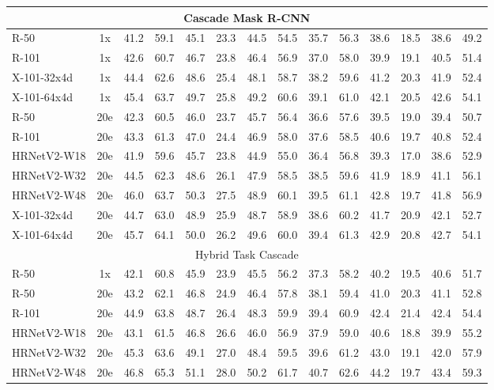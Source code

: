 \documentclass[10pt,journal,compsoc]{IEEEtran}
\begin{document}
\begin{center}
\begin{longtable}{l|c|cccccc|cccccc}
	\multicolumn{14}{c}{Cascade Mask R-CNN} \\
	\hline
	R-50        & 1x  & 41.2 & 59.1 & 45.1 & 23.3 & 44.5 & 54.5 & 35.7 & 56.3 & 38.6 & 18.5 & 38.6 & 49.2 \\
	R-101       & 1x  & 42.6 & 60.7 & 46.7 & 23.8 & 46.4 & 56.9 & 37.0 & 58.0 & 39.9 & 19.1 & 40.5 & 51.4 \\
	X-101-32x4d & 1x  & 44.4 & 62.6 & 48.6 & 25.4 & 48.1 & 58.7 & 38.2 & 59.6 & 41.2 & 20.3 & 41.9 & 52.4 \\
	X-101-64x4d & 1x  & 45.4 & 63.7 & 49.7 & 25.8 & 49.2 & 60.6 & 39.1 & 61.0 & 42.1 & 20.5 & 42.6 & 54.1 \\
	R-50        & 20e & 42.3 & 60.5 & 46.0 & 23.7 & 45.7 & 56.4 & 36.6 & 57.6 & 39.5 & 19.0 & 39.4 & 50.7 \\
	R-101       & 20e & 43.3 & 61.3 & 47.0 & 24.4 & 46.9 & 58.0 & 37.6 & 58.5 & 40.6 & 19.7 & 40.8 & 52.4 \\
    {HRNetV2-W18} & 20e & 41.9 & 59.6 & 45.7 & 23.8 & 44.9 & 55.0 & 36.4 & 56.8 & 39.3 & 17.0 & 38.6 & 52.9 \\
    {HRNetV2-W32} & 20e & 44.5 & 62.3 & 48.6 & 26.1 & 47.9 & 58.5 & 38.5 & 59.6 & 41.9 & 18.9 & 41.1 & 56.1 \\
    {HRNetV2-W48} & 20e & 46.0 & 63.7 & 50.3 & 27.5 & 48.9 & 60.1 & 39.5 & 61.1 & 42.8 & 19.7 & 41.8 & 56.9 \\
	X-101-32x4d & 20e & 44.7 & 63.0 & 48.9 & 25.9 & 48.7 & 58.9 & 38.6 & 60.2 & 41.7 & 20.9 & 42.1 & 52.7 \\
	X-101-64x4d & 20e & 45.7 & 64.1 & 50.0 & 26.2 & 49.6 & 60.0 & 39.4 & 61.3 & 42.9 & 20.8 & 42.7 & 54.1 \\
	\hline
	\multicolumn{14}{c}{Hybrid Task Cascade} \\
	\hline
	R-50        & 1x  & 42.1 & 60.8 & 45.9 & 23.9 & 45.5 & 56.2 & 37.3 & 58.2 & 40.2 & 19.5 & 40.6 & 51.7 \\
	R-50        & 20e & 43.2 & 62.1 & 46.8 & 24.9 & 46.4 & 57.8 & 38.1 & 59.4 & 41.0 & 20.3 & 41.1 & 52.8 \\
	R-101       & 20e & 44.9 & 63.8 & 48.7 & 26.4 & 48.3 & 59.9 & 39.4 & 60.9 & 42.4 & 21.4 & 42.4 & 54.4 \\
	{HRNetV2-W18} & 20e & 43.1 & 61.5 & 46.8 & 26.6 & 46.0 & 56.9 & 37.9 & 59.0 & 40.6 & 18.8 & 39.9 & 55.2 \\
    {HRNetV2-W32} & 20e & 45.3 & 63.6 & 49.1 & 27.0 & 48.4 & 59.5 & 39.6 & 61.2 & 43.0 & 19.1 & 42.0 & 57.9 \\
    {HRNetV2-W48} & 20e & 46.8 & 65.3 & 51.1 & 28.0 & 50.2 & 61.7 & 40.7 & 62.6 & 44.2 & 19.7 & 43.4 & 59.3 \\

\end{longtable}
\end{center}
\end{document}
